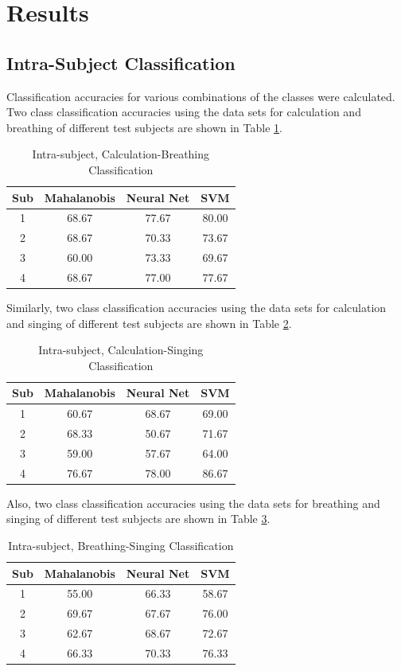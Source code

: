 \documentclass[11pt]{article}
\begin{document}
\section{Results}
	
	\subsection{Intra-Subject Classification}
		Classification accuracies for various combinations of the classes were calculated. Two class classification accuracies using the data sets for calculation and breathing of different test subjects are shown in Table \ref{ICB}.  
		\begin{table}[h!]
			\centering
			\caption{Intra-subject, Calculation-Breathing Classification}
			\label{ICB}
			\begin{tabular}{c c c c}
				\hline
				Sub &Mahalanobis &Neural Net &SVM\\\hline
				1 &68.67 &77.67 &80.00\\
				2 &68.67 &70.33 &73.67\\
				3 &60.00 &73.33 &69.67\\
				4 &68.67 &77.00 &77.67\\
			\end{tabular}
		\end{table}
		Similarly, two class classification accuracies using the data sets for calculation and singing of different test subjects are shown in Table \ref{ICS}.
		\begin{table}[h!]
			\centering
			\caption{Intra-subject, Calculation-Singing Classification}
			\label{ICS}
			\begin{tabular}{c c c c}
				\hline
				Sub &Mahalanobis &Neural Net &SVM\\\hline
				1 &60.67 &68.67 &69.00\\
				2 &68.33 &50.67 &71.67\\
				3 &59.00 &57.67 &64.00\\
				4 &76.67 &78.00 &86.67\\
			\end{tabular}
		\end{table}
		Also, two class classification accuracies using the data sets for breathing and singing of different test subjects are shown in Table \ref{IBS}.
		\begin{table}[h!]
			\centering
			\caption{Intra-subject, Breathing-Singing Classification}
			\label{IBS}
			\begin{tabular}{c c c c}
				\hline
				Sub &Mahalanobis &Neural Net &SVM\\\hline
				1 &55.00 &66.33 &58.67\\
				2 &69.67 &67.67 &76.00\\
				3 &62.67 &68.67 &72.67\\
				4 &66.33 &70.33 &76.33\\
			\end{tabular}
		\end{table}
\end{document}
